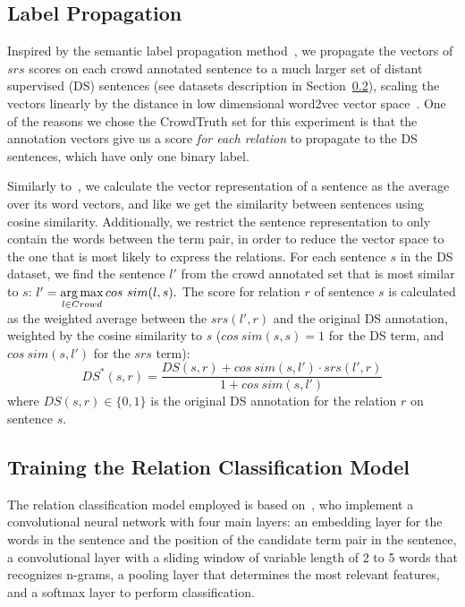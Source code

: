 \subsection{Label Propagation}
\label{sec:label-prop}

Inspired by the semantic label propagation method~\cite{sterckx2016knowledge}, we propagate the vectors of $srs$ scores on each crowd annotated sentence to a much larger set of distant supervised (DS) sentences (see datasets description in Section~\ref{sec:train}), scaling the vectors linearly by the distance in low dimensional word2vec vector space~\cite{mikolov2013distributed}.  One of the reasons we chose the CrowdTruth set for this experiment is that the annotation vectors give us a score \emph{for each relation} to propagate to the DS sentences, which have only one binary label.

 Similarly to~\citet{sultan2015dls}, we calculate the vector representation of a sentence as the average over its word vectors, and like \citet{sterckx2016knowledge} we get the similarity between sentences using cosine similarity. Additionally, we restrict the sentence representation to only contain the words between the term pair, in order to reduce the vector space to the one that is most likely to express the relations. For each sentence $s$ in the DS dataset, we find the sentence $l'$ from the crowd annotated set that is most similar to $s$: $ l' = \operatorname*{arg\,max}\limits_{l \in Crowd} cos\ sim(l, s). $ The score for relation $r$ of sentence $s$ is calculated as the weighted average between the $srs(l', r)$ and the original DS annotation, weighted by the cosine similarity to $s$ ($ cos\ sim(s,s) = 1$ for the DS term, and $ cos\ sim(s, l')$ for the $srs$ term):
\begin{equation} \label{eq:ds_w2v}
DS^{*}(s, r) =  \dfrac{DS(s, r) +  cos\ sim(s, l') \cdot srs(l', r)}{1 +  cos\ sim(s, l')}
\end{equation}
\noindent where $DS(s, r) \in \{0,1\}$ is the original DS annotation for the relation $r$ on sentence $s$.


\subsection{Training the Relation Classification Model}
\label{sec:train}

The relation classification model employed is based on~\citet{nguyen2015relation}, who implement a convolutional neural network with four main layers: an embedding layer for the words in the sentence and the position of the candidate term pair in the sentence, a convolutional layer with a sliding window of variable length of 2 to 5 words that recognizes n-grams, a pooling layer that determines the most relevant features, and a softmax layer to perform classification.

